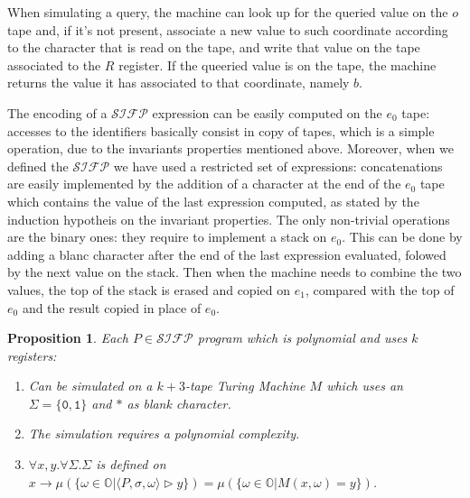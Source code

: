 \documentclass[10pt]{amsart}
\newcommand{\SIFP}{\mathcal{SIFP}}
\newcommand{\zero}{\mathtt{0}}
\newcommand{\one}{\mathtt{1}}
\newcommand{\OO}{\mathbb{O}}
\newcommand{\store}{\Sigma}
\newcommand{\ssos}{\triangleright}
\newtheorem{prop}{Proposition}
\begin{document}
When simulating a query, the machine can look up for the queried value on the $o$ tape and, if it's not present, associate a new value to such coordinate according to the character that is read on the tape, and write that value on the tape associated to the $R$ register. If the queeried value is on the tape, the machine returns the value it has associated to that coordinate, namely $b$.

The encoding of a $\SIFP$ expression can be easily computed on the $e_0$ tape: accesses to the identifiers basically consist in copy of tapes, which is a simple operation, due to the invariants properties mentioned above. Moreover, when we defined the $\SIFP$ we have used a restricted set of expressions: concatenations are easily implemented by the addition of a character at the end of the $e_0$ tape which contains the value of the last expression computed, as stated by the induction hypotheis on the invariant properties. The only non-trivial operations are the binary ones: they require to implement a stack on $e_0$. This can be done by adding a blanc character after the end of the last expression evaluated, folowed by the next value on the stack. Then when the machine needs to combine the two values, the top of the stack is erased and copied on $e_1$, compared with the top of $e_0$ and the result copied in place of $e_0$.  

\begin{prop}
\label{prop:sifptostream}
Each $P \in\SIFP$ program which is polynomial and uses $k$ registers:
\begin{enumerate} 
\item Can be simulated on a $k+3$-tape Turing Machine $M$ which uses an $\Sigma=\{\zero, \one\}$ and $*$ as blank character. 
\item The simulation requires a polynomial complexity.
\item $\forall x, y.\forall \store.\store$ is defined on $x \to \mu(\{\omega \in \OO | \langle P, \sigma, \omega\rangle \ssos y\})=\mu(\{\omega \in \OO | M(x, \omega)=y\})$.
\end{enumerate}
\end{prop}
\end{document}
